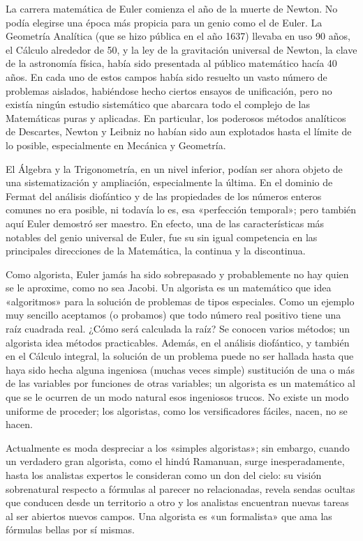 \documentclass[a4paper, 12pt]{article}
\begin{document}
La carrera matemática de Euler comienza el año de la muerte de Newton. No podía elegirse una época más propicia para un genio como el de Euler. La Geometría Analítica (que se hizo pública en el año 1637) llevaba en uso 90 años, el Cálculo alrededor de 50, y la ley de la gravitación universal de Newton, la clave de la astronomía física, había sido presentada al público matemático hacía 40 años. En cada uno de estos campos había sido resuelto un vasto número de problemas aislados, habiéndose hecho ciertos ensayos de unificación, pero no existía ningún estudio sistemático que abarcara todo el complejo de las Matemáticas puras y aplicadas. En particular, los poderosos métodos analíticos de Descartes, Newton y Leibniz no habían sido aun explotados hasta el límite de lo posible, especialmente en Mecánica y Geometría.

El Álgebra y la Trigonometría, en un nivel inferior, podían ser ahora objeto de una sistematización y ampliación, especialmente la última. En el dominio de Fermat del análisis diofántico y de las propiedades de los números enteros comunes no era posible, ni todavía lo es, esa «perfección temporal»; pero también aquí Euler demostró ser maestro. En efecto, una de las características más notables del genio universal de Euler, fue su sin igual competencia en las principales direcciones de la Matemática, la continua y la discontinua.

Como algorista, Euler jamás ha sido sobrepasado y probablemente no hay quien se le aproxime, como no sea Jacobi. Un algorista es un matemático que idea «algoritmos» para la solución de problemas de tipos especiales. Como un ejemplo muy sencillo aceptamos (o probamos) que todo número real positivo tiene una raíz cuadrada real. ¿Cómo será calculada la raíz? Se conocen varios métodos; un algorista idea métodos practicables. Además, en el análisis diofántico, y también en el Cálculo integral, la solución de un problema puede no ser hallada hasta que haya sido hecha alguna ingeniosa (muchas veces simple) sustitución de una o más de las variables por funciones de otras variables; un algorista es un matemático al que se le ocurren de un modo natural esos ingeniosos trucos. No existe un modo uniforme de proceder; los algoristas, como los versificadores fáciles, nacen, no se hacen.

Actualmente es moda despreciar a los «simples algoristas»; sin embargo, cuando un verdadero gran algorista, como el hindú Ramanuan, surge inesperadamente, hasta los analistas expertos le consideran como un don del cielo: su visión sobrenatural respecto a fórmulas al parecer no relacionadas, revela sendas ocultas que conducen desde un territorio a otro y los analistas encuentran nuevas tareas al ser abiertos nuevos campos. Una algorista es «un formalista» que ama las fórmulas bellas por sí mismas.
\end{document}
